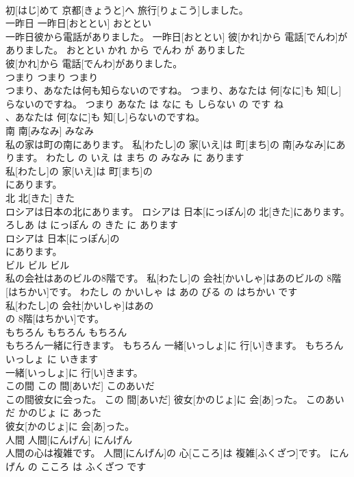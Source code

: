 \documentclass[8pt]{extreport}
\begin{document}
\begin{CJK}{UTF8}{min}
\\	初[はじ]めて 京都[きょうと]へ 旅行[りょこう]しました。			
\\	一昨日	一昨日[おととい]	おととい	
\\	一昨日彼から電話がありました。	一昨日[おととい] 彼[かれ]から 電話[でんわ]がありました。	おととい かれ から でんわ が ありました	
\\	彼[かれ]から 電話[でんわ]がありました。			
\\	つまり	つまり	つまり	
\\	つまり、あなたは何も知らないのですね。	つまり、あなたは 何[なに]も 知[し]らないのですね。	つまり あなた は なに も しらない の です ね	
\\	、あなたは 何[なに]も 知[し]らないのですね。			
\\	南	南[みなみ]	みなみ	
\\	私の家は町の南にあります。	私[わたし]の 家[いえ]は 町[まち]の 南[みなみ]にあります。	わたし の いえ は まち の みなみ に あります	
\\	私[わたし]の 家[いえ]は 町[まち]の
\\	にあります。			
\\	北	北[きた]	きた	
\\	ロシアは日本の北にあります。	ロシアは 日本[にっぽん]の 北[きた]にあります。	ろしあ は にっぽん の きた に あります	
\\	ロシアは 日本[にっぽん]の
\\	にあります。			
\\	ビル	ビル	ビル	
\\	私の会社はあのビルの8階です。	私[わたし]の 会社[かいしゃ]はあのビルの 8階[はちかい]です。	わたし の かいしゃ は あの びる の はちかい です	
\\	私[わたし]の 会社[かいしゃ]はあの
\\	の 8階[はちかい]です。			
\\	もちろん	もちろん	もちろん	
\\	もちろん一緒に行きます。	もちろん 一緒[いっしょ]に 行[い]きます。	もちろん いっしょ に いきます	
\\	一緒[いっしょ]に 行[い]きます。			
\\	この間	この 間[あいだ]	このあいだ	
\\	この間彼女に会った。	この 間[あいだ] 彼女[かのじょ]に 会[あ]った。	このあいだ かのじょ に あった	
\\	彼女[かのじょ]に 会[あ]った。			
\\	人間	人間[にんげん]	にんげん	
\\	人間の心は複雑です。	人間[にんげん]の 心[こころ]は 複雑[ふくざつ]です。	にんげん の こころ は ふくざつ です	

\end{CJK}
\end{document}
